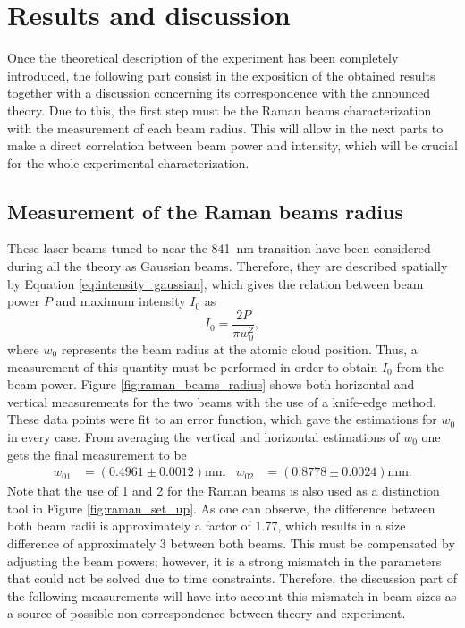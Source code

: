 
\chapter{Results and discussion}
\label{chap:results_and_discussion}

Once the theoretical description of the experiment has been completely introduced, the following part consist in the exposition of the obtained results together with a discussion concerning its correspondence with the announced theory. Due to this, the first step must be the Raman beams characterization with the measurement of each beam radius. This will allow in the next parts to make a direct correlation between beam power and intensity, which will be crucial for the whole experimental characterization.

\section{Measurement of the Raman beams radius}

These laser beams tuned to near the \SI{841}{\nano\meter} transition have been considered during all the theory as Gaussian beams. Therefore, they are described spatially by Equation \eqref{eq:intensity_gaussian}, which gives the relation between beam power $P$ and maximum intensity $I_{0}$ as
\begin{equation}
	I_0 = \frac{2P}{\pi w_0^2},
\end{equation}
where $w_0$ represents the beam radius at the atomic cloud position. Thus, a measurement of this quantity must be performed in order to obtain $I_0$ from the beam power. Figure \ref{fig:raman_beams_radius} shows both horizontal and vertical measurements for the two beams with the use of a knife-edge method. These data points were fit to an error function, which gave the estimations for $w_0$ in every case. From averaging the vertical and horizontal estimations of $w_0$ one gets the final measurement to be
\begin{align*}
	w_{01} &= (0.4961\pm0.0012)\si{\milli\meter}   &   w_{02} &= (0.8778\pm0.0024)\si{\milli\meter}.
\end{align*}
Note that the use of 1 and 2 for the Raman beams is also used as a distinction tool in Figure \ref{fig:raman_set_up}. As one can observe, the difference between both beam radii is approximately a factor of 1.77, which results in a size difference of approximately 3 between both beams. This must be compensated by adjusting the beam powers; however, it is a strong mismatch in the parameters that could not be solved due to time constraints. Therefore, the discussion part of the following measurements will have into account this mismatch in beam sizes as a source of possible non-correspondence between theory and experiment.

